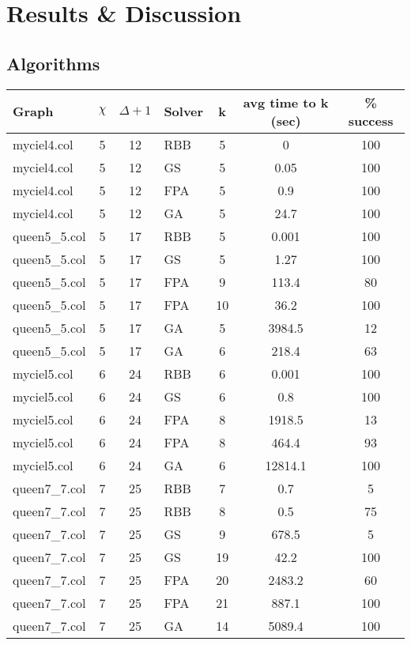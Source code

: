 \chapter{Results \& Discussion}

\section{Algorithms}



\begin{table}[H]
\centering
\begin{tabular}{|l c c l c c c|}
\hline
Graph & $\chi$ & $\Delta + 1$ & Solver & k & avg time to k (sec)& \% success\\ \hline

myciel4.col    & 5  & 12  & RBB & 5 & 0 & 100\\
myciel4.col    & 5  & 12  & GS  & 5 & 0.05 & 100\\
myciel4.col    & 5  & 12  & FPA & 5 & 0.9 & 100\\
myciel4.col    & 5  & 12  & GA  & 5 & 24.7 & 100\\ \hline

queen5\_5.col  & 5  & 17  & RBB & 5 & 0.001 & 100\\
queen5\_5.col  & 5  & 17  & GS  & 5 & 1.27 & 100\\
queen5\_5.col  & 5  & 17  & FPA & 9 & 113.4 & 80\\
queen5\_5.col  & 5  & 17  & FPA & 10 & 36.2 & 100\\
queen5\_5.col  & 5  & 17  & GA  & 5 & 3984.5 & 12\\
queen5\_5.col  & 5  & 17  & GA  & 6 & 218.4 & 63\\ \hline

myciel5.col    & 6  & 24  & RBB & 6 & 0.001 & 100\\
myciel5.col    & 6  & 24  & GS  & 6 & 0.8 & 100\\
myciel5.col    & 6  & 24  & FPA & 8 & 1918.5 & 13\\
myciel5.col    & 6  & 24  & FPA & 8 & 464.4 & 93\\
myciel5.col    & 6  & 24  & GA  & 6 & 12814.1 & 100\\ \hline

queen7\_7.col  & 7  & 25  & RBB & 7 & 0.7 & 5\\
queen7\_7.col  & 7  & 25  & RBB & 8 & 0.5 & 75\\
queen7\_7.col  & 7  & 25  & GS  & 9 & 678.5 & 5\\
queen7\_7.col  & 7  & 25  & GS  & 19 & 42.2 & 100\\
queen7\_7.col  & 7  & 25  & FPA & 20 & 2483.2 & 60\\
queen7\_7.col  & 7  & 25  & FPA & 21 & 887.1 & 100\\
queen7\_7.col  & 7  & 25  & GA  & 14 & 5089.4 & 100\\ \hline


\end{tabular}
\end{table}
